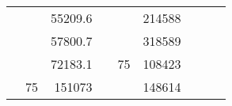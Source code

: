 \begin{table}[]
\begin{tabular}{|ccrccrccc}
\multicolumn{1}{|c|}{\cellcolor[HTML]{FFFFC7}}                                & \multicolumn{1}{c|}{\cellcolor[HTML]{DAE8FC}}                      & \multicolumn{1}{r|}{\cellcolor[HTML]{DAE8FC}55209.6}   & \multicolumn{1}{c|}{\cellcolor[HTML]{FFFFC7}}                                & \multicolumn{1}{c|}{\cellcolor[HTML]{DAE8FC}}                       & \multicolumn{1}{r|}{\cellcolor[HTML]{DDFDFF}214588}    &                                                                              &                                                                    &                                                        \\ \cline{3-3} \cline{6-6}
\multicolumn{1}{|c|}{\cellcolor[HTML]{FFFFC7}}                                & \multicolumn{1}{c|}{\cellcolor[HTML]{DAE8FC}}                      & \multicolumn{1}{r|}{\cellcolor[HTML]{DDFDFF}57800.7}   & \multicolumn{1}{c|}{\cellcolor[HTML]{FFFFC7}}                                & \multicolumn{1}{c|}{\cellcolor[HTML]{DAE8FC}}                       & \multicolumn{1}{r|}{\cellcolor[HTML]{DAE8FC}318589}    &                                                                              &                                                                    &                                                        \\ \cline{3-3} \cline{6-6}
\multicolumn{1}{|c|}{\cellcolor[HTML]{FFFFC7}}                                & \multicolumn{1}{c|}{\cellcolor[HTML]{DAE8FC}}                      & \multicolumn{1}{r|}{\cellcolor[HTML]{DAE8FC}72183.1}   & \multicolumn{1}{c|}{\cellcolor[HTML]{FFFFC7}}                                & \multicolumn{1}{c|}{\multirow{-10}{*}{\cellcolor[HTML]{DAE8FC}75}}  & \multicolumn{1}{r|}{\cellcolor[HTML]{DDFDFF}108423}    &                                                                              &                                                                    &                                                        \\ \cline{3-3} \cline{5-6}
\multicolumn{1}{|c|}{\cellcolor[HTML]{FFFFC7}}                                & \multicolumn{1}{c|}{\multirow{-10}{*}{\cellcolor[HTML]{DAE8FC}75}} & \multicolumn{1}{r|}{\cellcolor[HTML]{DDFDFF}151073}    & \multicolumn{1}{c|}{\cellcolor[HTML]{FFFFC7}}                                & \multicolumn{1}{c|}{\cellcolor[HTML]{DDFDFF}}                       & \multicolumn{1}{r|}{\cellcolor[HTML]{DAE8FC}148614}    &                                                                              &                                                                    &                                                        \\ \cline{2-3} \cline{6-6}

\end{tabular}
\end{table}
